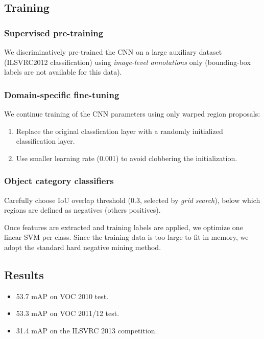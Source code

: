 \documentclass[a4paper,12pt]{article}
\begin{document}
\subsection{Training}

\subsubsection{Supervised pre-training}

We discriminatively pre-trained the CNN on a large auxiliary dataset (ILSVRC2012 classification) using \emph{image-level annotations} only (bounding-box labels are not available for this data).

\subsubsection{Domain-specific fine-tuning}

We continue training of the CNN parameters using only warped region proposals:

\begin{enumerate}
  \item Replace the original classfication layer with a randomly initialized classification layer.
  \item Use smaller learning rate (0.001) to avoid clobbering the initialization.
\end{enumerate}

\subsubsection{Object category classifiers}

Carefully choose IoU overlap threshold (0.3, selected by \emph{grid search}), below which regions are defined as negatives (others positives).

Once features are extracted and training labels are applied, we optimize one linear SVM per class. Since the training data is too large to fit in memory, we adopt the standard hard negative mining method.

\subsection{Results}

\begin{itemize}
  \item 53.7 mAP on VOC 2010 test.
  \item 53.3 mAP on VOC 2011/12 test.
  \item 31.4 mAP on the ILSVRC 2013 competition.
\end{itemize}
\end{document}
